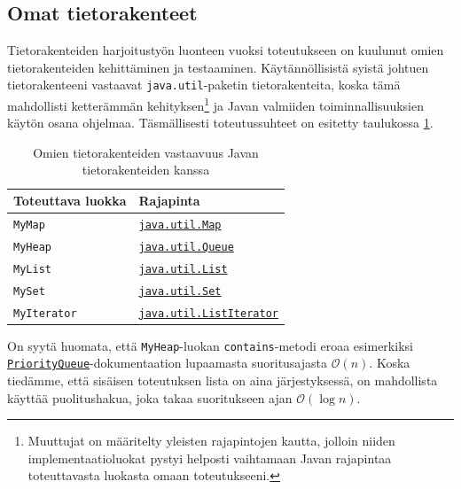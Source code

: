 \documentclass[10pt,a4paper]{article}
\begin{document}
\subsection{Omat tietorakenteet}
\label{datastructures}

Tietorakenteiden harjoitustyön luonteen vuoksi toteutukseen on kuulunut omien tietorakenteiden kehittäminen ja testaaminen. Käytännöllisistä syistä johtuen tietorakenteeni vastaavat \texttt{java.util}-paketin tietorakenteita, koska tämä mahdollisti ketterämmän kehityksen\footnote{Muuttujat on määritelty yleisten rajapintojen kautta, jolloin niiden implementaatioluokat pystyi helposti vaihtamaan Javan rajapintaa toteuttavasta luokasta omaan toteutukseeni.} ja Javan valmiiden toiminnallisuuksien käytön osana ohjelmaa. Täsmällisesti toteutussuhteet on esitetty taulukossa \ref{omat_tietorakenteet}.

\begin{table}

\begin{tabular}{l|l}
Toteuttava luokka & Rajapinta \\ 
\hline 
\texttt{MyMap} &  \href{http://docs.oracle.com/javase/6/docs/api/java/util/Map.html}{\texttt{java.util.Map}} \\
\texttt{MyHeap} & \href{http://docs.oracle.com/javase/6/docs/api/java/util/Queue.html}{\texttt{java.util.Queue}} \\ 
\texttt{MyList} & \href{http://docs.oracle.com/javase/6/docs/api/java/util/List.html}{\texttt{java.util.List}} \\ 
\texttt{MySet} & \href{http://docs.oracle.com/javase/6/docs/api/java/util/Set.html}{\texttt{java.util.Set}} \\ 
\texttt{MyIterator} & \href{http://docs.oracle.com/javase/6/docs/api/java/util/ListIterator.html}{\texttt{java.util.ListIterator}} \\ 
\end{tabular}

On syytä huomata, että \texttt{MyHeap}-luokan \texttt{contains}-metodi eroaa esimerkiksi \href{http://docs.oracle.com/javase/6/docs/api/java/util/PriorityQueue.html}{\texttt{PriorityQueue}}-dokumentaation lupaamasta suoritusajasta $\mathcal{O}(n)$. Koska tiedämme, että sisäisen toteutuksen lista on aina järjestyksessä, on mahdollista käyttää puolitushakua, joka takaa suoritukseen ajan $\mathcal{O}(\log n)$.

\caption{Omien tietorakenteiden vastaavuus Javan tietorakenteiden kanssa}
\label{omat_tietorakenteet}
\end{table}
\end{document}
